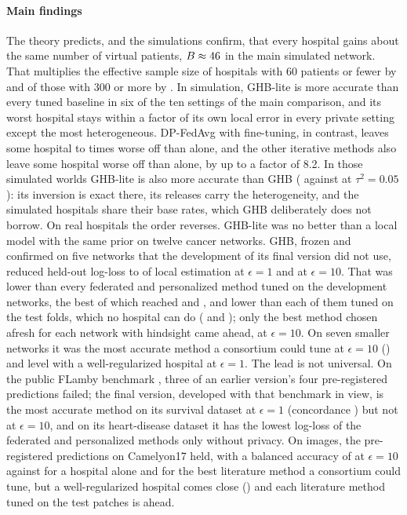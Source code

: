 \documentclass[acmsmall,screen,review]{acmart}
\theoremstyle{acmdefinition}
\begin{document}
\paragraph{Main findings} The theory predicts, and the simulations confirm, that every hospital gains about the same number of virtual patients, $B\approx46$ in the main simulated network. That multiplies the effective sample size of hospitals with 60 patients or fewer by \SimThreeSmall{} and of those with 300 or more by \SimThreeLarge. In simulation, GHB-lite is more accurate than every tuned baseline in six of the ten settings of the main comparison, and its worst hospital stays within a factor \SimFifteenGHBWorstMax{} of its own local error in every private setting except the most heterogeneous. DP-FedAvg \cite{mcmahan2018learning} with fine-tuning, in contrast, leaves some hospital \SimFifteenFTWorstMin{} to \SimFifteenFTWorstMax{} times worse off than alone, and the other iterative methods also leave some hospital worse off than alone, by up to a factor of 8.2. In those simulated worlds GHB-lite is also more accurate than GHB (\SimFifteenMidGHB{} against \SimFifteenMidV{} at $\tau^2=0.05$): its inversion is exact there, its releases carry the heterogeneity, and the simulated hospitals share their base rates, which GHB deliberately does not borrow. On real hospitals the order reverses. GHB-lite was no better than a local model with the same prior on twelve cancer networks. GHB, frozen and confirmed on five networks that the development of its final version did not use, reduced held-out log-loss to \SimTCOneGHB{} of local estimation at $\epsilon=1$ and \SimTCTenGHB{} at $\epsilon=10$. That was lower than every federated and personalized method tuned on the development networks, the best of which reached \SimTCOneFT{} and \SimTCTenDitto, and lower than each of them tuned on the test folds, which no hospital can do (\SimTCOneFTOrc{} and \SimTCTenDittoOrc); only the best method chosen afresh for each network with hindsight came ahead, at $\epsilon=10$. On seven smaller networks it was the most accurate method a consortium could tune at $\epsilon=10$ (\SimRFTenV) and level with a well-regularized hospital at $\epsilon=1$. The lead is not universal. On the public FLamby benchmark \cite{ogierduterrail2022flamby}, three of an earlier version's four pre-registered predictions failed; the final version, developed with that benchmark in view, is the most accurate method on its survival dataset at $\epsilon=1$ (concordance \SimFBrcaOneVFive) but not at $\epsilon=10$, and on its heart-disease dataset it has the lowest log-loss of the federated and personalized methods only without privacy. On images, the pre-registered predictions on Camelyon17 held, with a balanced accuracy of \SimCamTenGHB{} at $\epsilon=10$ against \SimCamLocal{} for a hospital alone and \SimCamTenBestReal{} for the best literature method a consortium could tune, but a well-regularized hospital comes close (\SimCamLocalEB) and each literature method tuned on the test patches is ahead.
\end{document}
